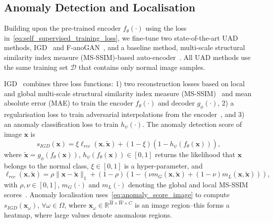 \documentclass[runningheads]{llncs}
\begin{document}
\subsection{Anomaly Detection and Localisation}
\label{sec:anomaly_detection_localisation}

Building upon the pre-trained encoder $f_\theta(\cdot)$ using the loss in~\eqref{eq:self_supervised_training_loss}, we fine-tune two state-of-the-art UAD methods, IGD~\cite{chen2021unsupervised} and F-anoGAN~\cite{F-anoGAN}, and a baseline method, multi-scale structural similarity index measure (MS-SSIM)-based auto-encoder~\cite{wang2003multiscale}.
All UAD methods use the same training set $\mathcal{D}$ that contains only normal image samples. 


IGD~\cite{chen2021unsupervised} combines three loss functions: 1) two reconstruction losses based on local and global multi-scale structural similarity index measure (MS-SSIM)~\cite{wang2003multiscale} and mean absolute error (MAE) to train the encoder $f_{\theta}(\cdot)$ and decoder $g_{\phi}(\cdot)$, 2) a regularisation loss to train adversarial interpolations from the encoder~\cite{berthelot2018understanding}, and 3) an anomaly  classification loss to train $h_{\psi}(\cdot)$. The anomaly detection score of image $\mathbf{x}$ is
\begin{equation}
    s_{IGD}(\mathbf{x}) = \xi \ell_{rec}(\mathbf{x},\tilde{\mathbf{x}}) + (1-\xi)(1 - h_{\psi}(f_{\theta}(\mathbf{x}))),
    \label{eq:anomaly_score_image}
\end{equation}
where $\tilde{\mathbf{x}} =g_{\phi}(f_{\theta}(\mathbf{x}))$,
$h_{\psi}(f_{\theta}(\mathbf{x})) \in [0,1]$ returns the likelihood that $\mathbf{x}$ belongs to the normal class, $\xi \in [0,1]$ is a hyper-parameter, and
\begin{equation}
    \ell_{rec}(\mathbf{x},\tilde{\mathbf{x}}) =
    \rho \| \mathbf{x} - \tilde{\mathbf{x}} \|_1 + 
     (1-\rho) \left ( 1-\left( 
     \nu m_{G}(\mathbf{x},\tilde{\mathbf{x}}) + (1-\nu)m_{L}(\mathbf{x},\tilde{\mathbf{x}}) \right ) \right ),
    \label{eq:reconstruction error}
\end{equation}
with $\rho,\nu \in [0,1]$, $m_{G}(\cdot)$ and $m_{L}(\cdot)$ denoting the global and local MS-SSIM scores~\cite{chen2021unsupervised}.
Anomaly localisation uses~\eqref{eq:anomaly_score_image} to compute $s_{IGD}(\mathbf{x}_{\omega})$, $\forall \omega \in \Omega$, where $\mathbf{x}_{\omega} \in \mathbb{R}^{\hat{H} \times \hat{W} \times C}$ is an image region--this forms a heatmap, where large values denote anomalous regions.
\end{document}
